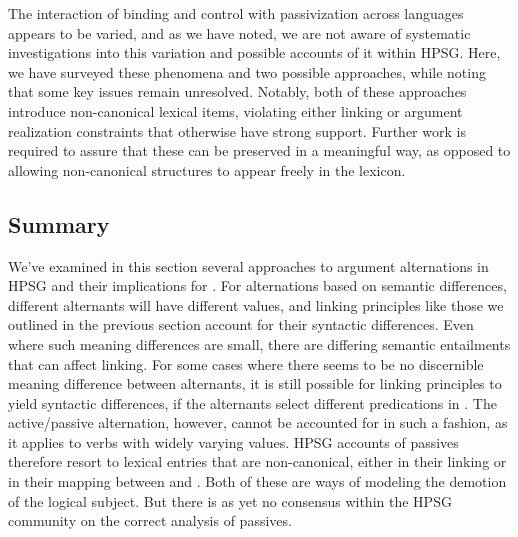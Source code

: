 \documentclass[output=paper
                ,modfonts
                ,nonflat
	        ,collection
	        ,collectionchapter
	        ,collectiontoclongg
 	        ,biblatex
                ,babelshorthands
                ,newtxmath
                ,draftmode
                ,colorlinks, citecolor=brown
]{./langsci/langscibook}
\begin{document}
The interaction of binding and control with passivization across languages appears to be varied, and as we have noted, we are not aware of systematic investigations into this variation and possible accounts of it within HPSG.
Here, we have surveyed these phenomena and two possible approaches, while noting that some key issues remain unresolved.
Notably, both of these approaches introduce non-canonical lexical items, violating either linking or argument realization constraints that otherwise have strong support. 
Further work is required to assure that these can be preserved in a meaningful way, as opposed to allowing non-canonical structures to appear freely in the lexicon.

\subsection{Summary}

We've examined in this section several approaches to argument alternations in HPSG and their implications for \argst.
For alternations based on semantic differences, different alternants will have different  values, and linking principles like those we outlined in the previous section account for their syntactic differences.
Even where such meaning differences are small, there are differing semantic entailments that can affect linking.
For some cases where there seems to be no discernible meaning difference between alternants, it is still possible for linking principles to yield syntactic differences, if the alternants select different  predications in .
The active/passive alternation, however, cannot be accounted for in such a fashion, as it applies to verbs with widely varying  values.
HPSG accounts of passives therefore resort to lexical entries that are non-canonical, either in their linking or in their mapping between \argst and \val.
Both of these are ways of modeling the demotion of the logical subject.
But there is as yet no consensus within the HPSG community on the correct analysis of passives.
\end{document}
